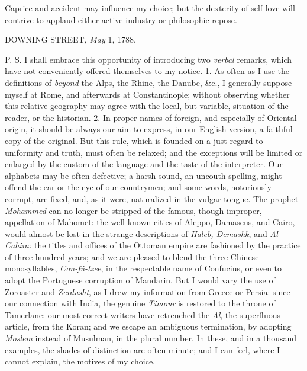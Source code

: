 Caprice and accident may influence my choice; but the dexterity of self-love will contrive to applaud either active industry or philosophic repose.

DOWNING STREET, \textit{May} 1, 1788.

P. S. I shall embrace this opportunity of introducing two \textit{verbal} remarks, which have not conveniently offered themselves to my notice. 1. As often as I use the definitions of \textit{beyond} the Alps, the Rhine, the Danube, \&c., I generally suppose myself at Rome, and afterwards at Constantinople; without observing whether this relative geography may agree with the local, but variable, situation of the reader, or the historian. 2. In proper names of foreign, and especially of Oriental origin, it should be always our aim to express, in our English version, a faithful copy of the original. But this rule, which is founded on a just regard to uniformity and truth, must often be relaxed; and the exceptions will be limited or enlarged by the custom of the language and the taste of the interpreter. Our alphabets may be often defective; a harsh sound, an uncouth spelling, might offend the ear or the eye of our countrymen; and some words, notoriously corrupt, are fixed, and, as it were, naturalized in the vulgar tongue. The prophet \textit{Mohammed} can no longer be stripped of the famous, though improper, appellation of Mahomet: the well-known cities of Aleppo, Damascus, and Cairo, would almost be lost in the strange descriptions of \textit{Haleb, Demashk}, and \textit{Al Cahira:} the titles and offices of the Ottoman empire are fashioned by the practice of three hundred years; and we are pleased to blend the three Chinese monosyllables, \textit{Con-fû-tzee}, in the respectable name of Confucius, or even to adopt the Portuguese corruption of Mandarin. But I would vary the use of Zoroaster and \textit{Zerdusht}, as I drew my information from Greece or Persia: since our connection with India, the genuine \textit{Timour} is restored to the throne of Tamerlane: our most correct writers have retrenched the \textit{Al}, the superfluous article, from the Koran; and we escape an ambiguous termination, by adopting \textit{Moslem} instead of Musulman, in the plural number. In these, and in a thousand examples, the shades of distinction are often minute; and I can feel, where I cannot explain, the motives of my choice.

